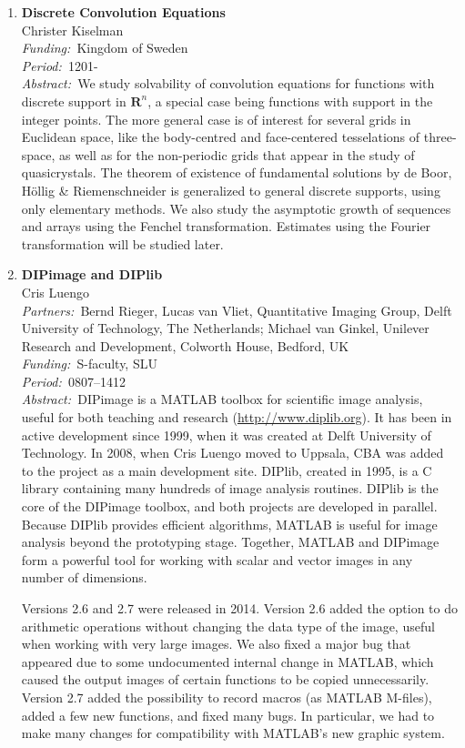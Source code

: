 \documentclass[10pt, a4paper]{article}
\newcommand{\aabstract}[1]{\emph{Abstract:~}#1}
\newcommand{\ffunding}[1]{\emph{Funding:~}#1\\}
\newcommand{\ppartners}[1]{\emph{Partners:~}#1\\}
\newcommand{\pperiod}[1]{\emph{Period:~}#1\\}
\begin{document}
{\begin{enumerate}
%
\newpage
\item 
\textbf{Discrete Convolution Equations}\\
Christer Kiselman\\
\ffunding{Kingdom of Sweden}
\pperiod{1201-}
\aabstract{We study solvability of convolution equations for functions with discrete support in $\mathbf{R}^n$, a special case being 
functions with support in the integer points.  The more general case is of interest for several grids in Euclidean space, like the 
body-centred and face-centered tesselations of three-space, as well 
as for the non-periodic grids that appear in the study of 
quasicrystals.  The theorem of existence of fundamental solutions by de Boor, H\"{o}llig \& Riemenschneider is generalized to general discrete supports, using only elementary methods.  We also study the asymptotic 
growth of sequences and arrays using the Fenchel transformation. Estimates using the Fourier transformation will be studied later.}


\item
\label{proj:dipimage}
\textbf{DIPimage and DIPlib}\\
Cris Luengo\\
\ppartners{Bernd Rieger, Lucas van Vliet, Quantitative Imaging Group, Delft University of Technology, The Netherlands; Michael van Ginkel, Unilever Research and Development, Colworth House, Bedford, UK}
\ffunding{S-faculty, SLU}
\pperiod{0807--1412}
\aabstract{DIPimage is a MATLAB toolbox for scientific image analysis, useful for both teaching and research (\url{http://www.diplib.org}). It has been in active development since 1999, when it was created at Delft University of Technology. In 2008, when Cris Luengo moved to Uppsala, CBA was added to the project as a main development site. DIPlib, created in 1995, is a C library containing many hundreds of image analysis routines. DIPlib is the core of the DIPimage toolbox, and both projects are developed in parallel. Because DIPlib provides efficient algorithms, MATLAB is useful for image analysis beyond the prototyping stage. Together, MATLAB and DIPimage form a powerful tool for working with scalar and vector images in any number of dimensions.
	
	Versions 2.6 and 2.7 were released in 2014. Version 2.6 added the option to do arithmetic operations without changing the data type of the image, useful when working with very large images. We also fixed a major bug that appeared due to some undocumented internal change in MATLAB, which caused the output images of certain functions to be copied unnecessarily. Version 2.7 added the  possibility to record macros (as MATLAB M-files), added a few new functions, and fixed many bugs. In particular, we had to make many changes for compatibility with MATLAB's new graphic system.} 


\end{enumerate}}
\end{document}
